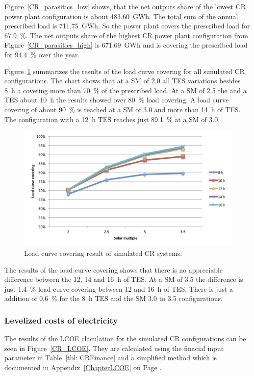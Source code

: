 Figure~\ref{CR_parasitics_low} shows, that the net outputs share of the lowest CR power plant configuration is about 483.60~GWh.  The total sum of the annual prescribed load is 711.75~GWh. So the power plant covers the prescribed load for 67.9~\%. The net outputs share of the highest CR power plant configuration from Figure~\ref{CR_parasitics_high} is 671.69~GWh and is covering the prescribed load for 94.4~\% over the year.

Figure~\ref{CR_LCCF} summarizes the results of the load curve covering for all simulated CR configurations. The chart shows that at a SM of 2.0 all TES variations besides 8~h a covering more than 70~\% of the prescribed load. At a SM of 2.5 the and a TES about 10~h the results showed over 80~\% load covering. A load curve covering of about 90~\% is reached at a SM of 3.0 and more than 14~h of TES. The configuration with a 12~h TES reaches just 89.1~\% at a SM of 3.0. 

\begin{figure}[htbp]  
\centering
\includegraphics[width=1\linewidth]{FIG/CR_LCCF}
\caption[Load curve covering result of simulated CR systems.]{Load curve covering result of simulated CR systems.}\label{CR_LCCF}
\end{figure}
The results of the load curve covering shows that there is no appreciable difference between the 12, 14 and 16~h of TES. At a SM of 3.5 the difference is just 1.4~\% load curve covering between 12 and 16~h of TES. There is just a addition of 0.6~\% for the 8~h TES and the SM 3.0 to 3.5 configurations. 
\subsubsection{Levelized costs of electricity}
The results of the LCOE claculation for the simulated CR configurations can be seen in Figure~\ref{CR_LCOE}. They are calculated using the finacial input parameter in Table~\ref{tbl: CRFinance} and a simplified method which is documented in Appendix~\ref{ChapterLCOE} on Page \pageref{ChapterLCOE}.

